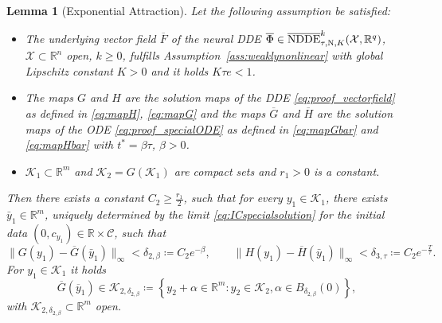 \documentclass[10pt]{article}
\numberwithin{equation}{section}
\newtheorem{lemma}[theorem]{Lemma}
\newcommand\normk[1]{\lVert#1\lVert}
\newcommand{\R}{\mathbb{R}}
\begin{document}
	\begin{lemma}[Exponential Attraction] \label{lem:exponentialattraction}
		Let the following assumption be satisfied:
		\begin{itemize}
			\item The underlying vector field $\overline{F}$ of the neural DDE $\overline{\Phi}\in\overline{\textup{NDDE}}^k_{\tau,\textup{N},K}(\mathcal{X},\mathbb{R}^q)$, $\mathcal{X}\subset \mathbb{R}^n$ open, $k \geq 0$, fulfills Assumption~\ref{ass:weaklynonlinear} with global Lipschitz constant $K>0$ and it holds $K\tau e <1$.
			\item The maps $G$ and $H$ are the solution maps of the DDE \eqref{eq:proof_vectorfield} as defined in \eqref{eq:mapH}, \eqref{eq:mapG} and the maps   $\overline{G}$ and $\overline{H}$ are the solution maps of the ODE \eqref{eq:proof_specialODE} as defined in \eqref{eq:mapGbar} and \eqref{eq:mapHbar} with $t^\ast = \beta \tau$, $\beta>0$. 
			\item $\mathcal{K}_1 \subset \mathbb{R}^m$ and $\mathcal{K}_2 = G(\mathcal{K}_1)$ are compact sets and $r_1>0$ is a constant.
		\end{itemize}
		Then there exists a constant $C_2\geq\frac{r_1}{2}$, such that for every $y_1 \in \mathcal{K}_1$, there exists $\bar{y}_1\in \mathbb{R}^m$, uniquely determined by the limit \eqref{eq:ICspecialsolution} for the initial data $(0,c_{y_1})\in\R\times \mathcal{C}$, such that
		\begin{equation*}
			\normk{G(y_1)-\overline{G}(\bar{y}_1)}_\infty < \delta_{2,\beta} \coloneqq C_2 e^{-\beta}, \qquad \normk{H(y_1)-\overline{H}(\bar{y}_1)}_\infty < \delta_{3,\tau} \coloneqq C_2 e^{-\frac{T}{\tau}}. 
		\end{equation*}
		For $y_1 \in \mathcal{K}_1$ it holds
		\begin{equation*}
			\overline{G}(\overline{y}_1) \in 	\mathcal{K}_{2,\delta_{2,\beta}} \coloneqq \left\{ y_2 + \alpha \in \mathbb{R}^m: y_2 \in \mathcal{K}_2, \alpha \in B_{\delta_{2,\beta}}(0)\right\},
		\end{equation*}
		with $\mathcal{K}_{2,\delta_{2,\beta}}\subset \mathbb{R}^m$ open.
	\end{lemma}
	
\end{document}
